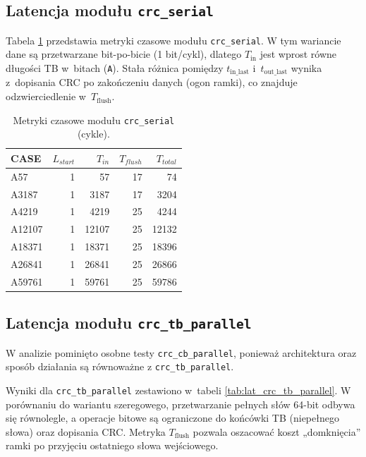 \subsection{Latencja modułu \texttt{crc\_serial}}
\label{subsec:lat_crc_serial}

Tabela \ref{tab:lat_crc_serial} przedstawia metryki czasowe modułu \texttt{crc\_serial}.
W tym wariancie dane są przetwarzane bit-po-bicie (1 bit/cykl), dlatego $T_{\mathrm{in}}$ jest wprost równe długości TB w~bitach
(\texttt{A}). Stała różnica pomiędzy $t_{\mathrm{in\_last}}$ i~$t_{\mathrm{out\_last}}$ wynika z~dopisania CRC po zakończeniu danych
(ogon ramki), co znajduje odzwierciedlenie w~$T_{\mathrm{flush}}$.


\begin{table}[!ht]
\centering
\caption{Metryki czasowe modułu \texttt{crc\_serial} (cykle).}
\label{tab:lat_crc_serial}
\begin{tabular}{lrrrr}
\hline
CASE & $L_{start}$ & $T_{in}$ & $T_{flush}$ & $T_{total}$ \\
\hline
A57     & 1 & 57    & 17 & 74 \\
A3187   & 1 & 3187  & 17 & 3204 \\
A4219   & 1 & 4219  & 25 & 4244 \\
A12107  & 1 & 12107 & 25 & 12132 \\
A18371  & 1 & 18371 & 25 & 18396 \\
A26841  & 1 & 26841 & 25 & 26866 \\
A59761  & 1 & 59761 & 25 & 59786 \\
\hline
\end{tabular}
\end{table}

\subsection{Latencja modułu \texttt{crc\_tb\_parallel}}
\label{subsec:lat_crc_tb_parallel}

W analizie pominięto osobne testy \texttt{crc\_cb\_parallel}, ponieważ architektura oraz sposób działania są równoważne
z \texttt{crc\_tb\_parallel}.

Wyniki dla \texttt{crc\_tb\_parallel} zestawiono w~tabeli \ref{tab:lat_crc_tb_parallel}.
W porównaniu do wariantu szeregowego, przetwarzanie pełnych słów 64-bit odbywa się równolegle,
a operacje bitowe są ograniczone do końcówki TB (niepełnego słowa) oraz dopisania CRC.
Metryka $T_{\mathrm{flush}}$ pozwala oszacować koszt „domknięcia” ramki po przyjęciu ostatniego słowa wejściowego.




